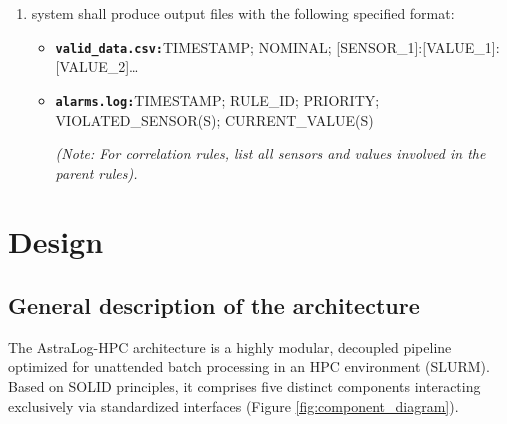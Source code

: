 \documentclass[11pt, a4paper]{article}
\begin{document}
\begin{enumerate}[label=\textbf{CR-\arabic*:}, align=left, leftmargin=2cm]
\begin{itemize}[leftmargin=0cm]
\begin{verbatim}
        // stateful
        {
            "rule_id": "str",
            "type": "stateful",
            "sensor_id": "str",
            "operator": ">",
            "value": 0.0,
            "consecutive_measurements": 3,
            "priority": "MEDIUM"
        }
        \end{verbatim}
        \newpage
        \begin{verbatim}
        // correlation (accepting 2+ rules)
        {
            "rule_id": "str",
            "type": "correlation",
            "logic": "AND",        // AND | OR
            "conditions": ["rule_id_1", "rule_id_2", "rule_id_3"],
            "priority": "HIGH"
        }
        \end{verbatim}
        \item \textbf{\texttt{sensors.yaml:}}
        \begin{verbatim}
        {
            sensors:
            - id: <str>
              sampling_rate: <int>Hz
              unit: <str>
            - ...
        }
        \end{verbatim}
    \end{itemize}
    \item system shall produce output files with the following specified format:
    \begin{itemize}[leftmargin=0cm]
        \item \textbf{\texttt{valid\_data.csv:}}\newline TIMESTAMP; NOMINAL; [SENSOR\_1]:[VALUE\_1]\textbar[SENSOR\_2]:[VALUE\_2]\textbar\dots
        \item \textbf{\texttt{alarms.log:}}\newline TIMESTAMP; RULE\_ID; PRIORITY; VIOLATED\_SENSOR(S); CURRENT\_VALUE(S) \par \textit{(Note: For correlation rules, list all sensors and values involved in the parent rules).}
    \end{itemize}
\end{enumerate}
\newpage

\section{Design}

\subsection{General description of the architecture}
The AstraLog-HPC architecture is a highly modular, decoupled pipeline optimized for unattended batch processing in an HPC environment (SLURM). Based on SOLID principles, it comprises five distinct components interacting exclusively via standardized interfaces (Figure \ref{fig:component_diagram}).
\end{document}
